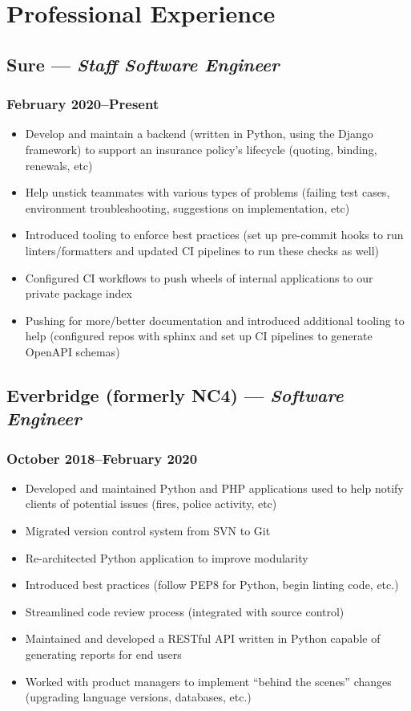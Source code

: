 \documentclass{article}
\begin{document}
\begin{minipage}[t]{.6\textwidth}
	\section*{Professional Experience}
	\subsection*{Sure  --- \textit{Staff Software Engineer}}
	\subsubsection*{February 2020--Present}
	\begin{itemize}
		\item Develop and maintain a backend (written in Python, using the Django framework)
		      to support an insurance policy's lifecycle (quoting, binding, renewals, etc)
		\item Help unstick teammates with various types of problems (failing test cases,
		      environment troubleshooting, suggestions on implementation, etc)
		\item Introduced tooling to enforce best practices (set up pre-commit hooks to run
		      linters/formatters and updated CI pipelines to run these checks as well)
		\item Configured CI workflows to push wheels of internal applications to our private
		      package index
		\item Pushing for more/better documentation and introduced additional tooling to help
		      (configured repos with sphinx and set up CI pipelines to generate OpenAPI
		      schemas)
	\end{itemize}
	\subsection*{Everbridge (formerly NC4) --- \textit{Software Engineer}}
	\subsubsection*{October 2018--February 2020}
	\begin{itemize}
		\item Developed and maintained Python and PHP applications used to help notify
		      clients of potential issues (fires, police activity, etc)
		\item Migrated version control system from SVN to Git
		\item Re-architected Python application to improve modularity
		\item Introduced best practices (follow PEP8 for Python, begin linting code, etc.)
		\item Streamlined code review process (integrated with source control)
		\item Maintained and developed a RESTful API written in Python capable of generating
		      reports for end users
		\item Worked with product managers to implement ``behind the scenes'' changes
		      (upgrading language versions, databases, etc.)
	\end{itemize}

\end{minipage}
\end{document}
